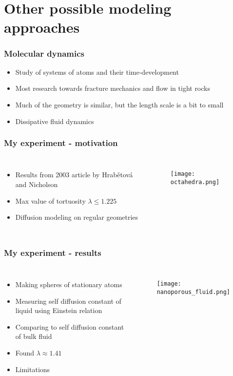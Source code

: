 \documentclass{beamer}
\begin{document}
\section{Other possible modeling approaches}
\begin{frame}
 \frametitle{Molecular dynamics}
 \begin{itemize}
  \item Study of systems of atoms and their time-development
  \item Most research towards fracture mechanics and flow in tight rocks
  \item Much of the geometry is similar, but the length scale is a bit to small
  \item Dissipative fluid dynamics
 \end{itemize}
 
\end{frame}

\begin{frame}
 \frametitle{My experiment - motivation}
 \begin{columns}
  \column{2.0in}
  \begin{itemize}
   \item Results from 2003 article by Hrab\v{e}tov\'{a} and Nicholson
   \item Max value of tortuosity $\lambda \leq 1.225$
   \item Diffusion modeling on regular geometries
  \end{itemize}
\column{2.0in}
\begin{figure}[H]
\centering
\texttt{[image: octahedra.png]}
\end{figure}

 \end{columns}

\end{frame}

\begin{frame}
 \frametitle{My experiment - results}
 \begin{columns}
  \column{2.0in}
  \begin{itemize}
   \item Making spheres of stationary atoms
   \item Measuring self diffusion constant of liquid using Einstein relation
   \item Comparing to self diffusion constant of bulk fluid
   \item Found $\lambda \approx 1.41$
   \item Limitations
  \end{itemize}
\column{2.0in}
\begin{figure}[H]
\centering
\texttt{[image: nanoporous\_fluid.png]}
 \end{figure}

 \end{columns}

\end{frame}
\end{document}
